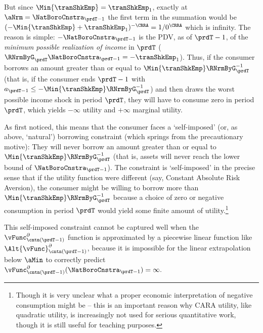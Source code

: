 \documentclass[SolvingMicroDSOPs]{subfiles}
\begin{document}
But since $\Min{\tranShkEmp}=\tranShkEmp_{1}$, exactly at $\aNrm=\NatBoroCnstra_{\prdT-1}$ the first term in the summation would be $(-\Min{\tranShkEmp}+\tranShkEmp_{1})^{-\CRRA}=1/0^{\CRRA}$ which is infinity.  The reason is simple: $-\NatBoroCnstra_{\prdT-1}$ is the PDV, as of $\prdT-1$, of the \emph{minimum possible realization of income} in $\prdT$ ($\RNrmByG_{\prdT}\NatBoroCnstra_{\prdT-1} = -\tranShkEmp_{1}$).  Thus, if the consumer borrows an amount greater than or equal to $\Min{\tranShkEmp}\RNrmByG_{\prdT}^{-1}$ (that is, if the consumer ends $\prdT-1$ with $a_{\prdT-1} \leq -\Min{\tranShkEmp}\RNrmByG_{\prdT}^{-1}$) and then draws the worst possible income shock in period $\prdT$, they will have to consume zero in period $\prdT$, which yields $-\infty$ utility and $+\infty$ marginal utility.

As \cite{zeldesStochastic} first noticed, this means that the consumer faces a `self-imposed' (or, as above, `natural') borrowing constraint (which springs from the precautionary motive): They will never borrow an amount greater than or equal to $\Min{\tranShkEmp}\RNrmByG_{\prdT}^{-1}$ (that is, assets will never reach the lower bound of $\NatBoroCnstra_{\prdT-1}$).  The constraint is `self-imposed' in the precise sense that if the utility function were different (say, Constant Absolute Risk Aversion), the consumer might be willing to borrow more than $\Min{\tranShkEmp}\RNrmByG_{\prdT}^{-1}$ because a choice of zero or negative consumption in period $\prdT$ would yield some finite amount of utility.\footnote{Though it is very unclear what a proper economic interpretation of negative consumption might be -- this is an important reason why CARA utility, like quadratic utility, is increasingly not used for serious quantitative work, though it is still useful for teaching purposes.}

This self-imposed constraint cannot be captured well when the $\vFunc^{\partial}_{{\cntn}(\prdT-1)}$ function is approximated by a piecewise linear function like $\Alt{\vFunc}^{\partial}_{{\cntn}(\prdT-1)}$, because it is impossible for the linear extrapolation below $\aMin$ to correctly predict $\vFunc^{\partial}_{{\cntn}(\prdT-1)}(\NatBoroCnstra_{\prdT-1})=\infty.$ %
\end{document}
